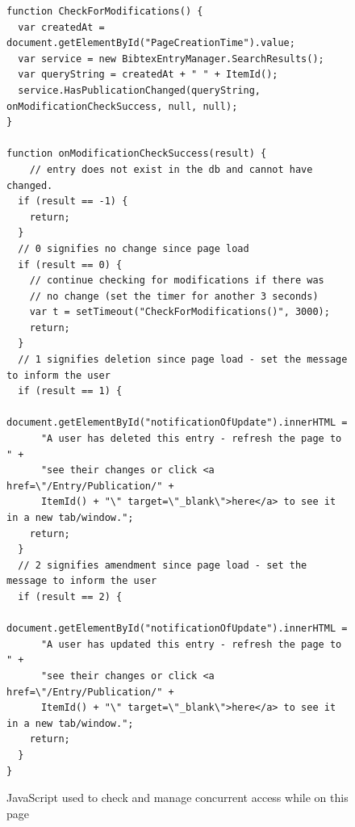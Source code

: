 \begin{figure}
	\begin{center}
			\lstset{language=JavaScript} 
			\begin{lstlisting}
function CheckForModifications() {
  var createdAt = document.getElementById("PageCreationTime").value;
  var service = new BibtexEntryManager.SearchResults();
  var queryString = createdAt + " " + ItemId();
  service.HasPublicationChanged(queryString, onModificationCheckSuccess, null, null);
}

function onModificationCheckSuccess(result) {
	// entry does not exist in the db and cannot have changed.
  if (result == -1) {
    return;
  }
  // 0 signifies no change since page load
  if (result == 0) {
    // continue checking for modifications if there was 
    // no change (set the timer for another 3 seconds)
    var t = setTimeout("CheckForModifications()", 3000);
    return;
  }
  // 1 signifies deletion since page load - set the message to inform the user
  if (result == 1) {
    document.getElementById("notificationOfUpdate").innerHTML =
      "A user has deleted this entry - refresh the page to " +
      "see their changes or click <a href=\"/Entry/Publication/" +
      ItemId() + "\" target=\"_blank\">here</a> to see it in a new tab/window.";
    return;
  }
  // 2 signifies amendment since page load - set the message to inform the user
  if (result == 2) {
    document.getElementById("notificationOfUpdate").innerHTML =
      "A user has updated this entry - refresh the page to " +
      "see their changes or click <a href=\"/Entry/Publication/" +
      ItemId() + "\" target=\"_blank\">here</a> to see it in a new tab/window.";
    return;
  }
}
			\end{lstlisting}
		\caption{JavaScript used to check and manage concurrent access while on this page}
		\label{fig:PublicationAjaxUpdate}
	\end{center}
\end{figure}


